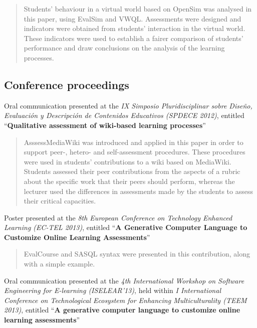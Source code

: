 \begin{quote}Students’ behaviour in a virtual world based on OpenSim was analysed in this paper, using EvalSim and VWQL. Assessments were designed and indicators were obtained from students’ interaction in the virtual world. These indicators were used to establish a fairer comparison of students’ performance and draw conclusions on the analysis of the learning processes.\end{quote}


	\subsection*{Conference proceedings}

Oral communication presented at the \emph{IX Simposio Pluridisciplinar sobre Diseño, Evaluación y Descripción de Contenidos Educativos (SPDECE 2012)}, entitled ``\textbf{Qualitative assessment of wiki-based learning processes}''~\cite{Balderas:2012}

\begin{quote}AsssessMediaWiki was introduced and applied in this paper in order to support peer-, hetero- and self-assessment procedures. These procedures were used in students’ contributions to a wiki based on MediaWiki. Students assessed their peer contributions from the aspects of a rubric about the specific work that their peers should perform, whereas the lecturer used the differences in assessments made by the students to assess their critical capacities.\end{quote}

\noindent
Poster presented at the \emph{8th European Conference on Technology Enhanced Learning (EC-TEL 2013)}, entitled ``\textbf{A Generative Computer Language to Customize Online Learning Assessments}''~\cite{Balderas:2013}

\begin{quote}EvalCourse and SASQL syntax were presented in this contribution, along with a simple example.\end{quote}

\noindent
Oral communication presented at the \emph{4th International Workshop on Software Engineering for E-learning (ISELEAR’13)}, held within \emph{I International Conference on Technological Ecosystem for Enhancing Multiculturality (TEEM 2013)}, entitled ``\textbf{A generative computer language to customize online learning assessments}''~\cite{balderas2013generative}

